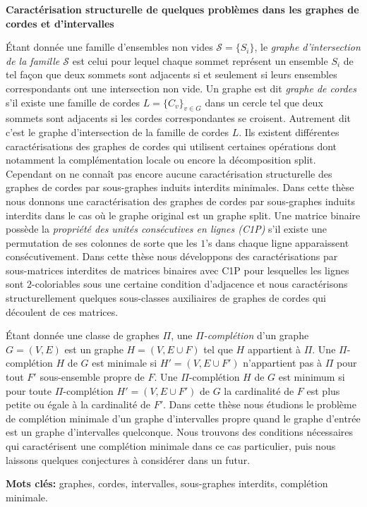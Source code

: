 \documentclass[12pt]{book}
\theoremstyle{plain}
\theoremstyle{remark}
\newenvironment{abstract}%
{\clearpage\null \vfill\begin{center}%
\bfseries \abstractname \end{center}}%
{\vfill\null}
\begin{document}

%
\begin{abstract}

\begin{center}
\textbf{Caractérisation structurelle de quelques problèmes dans les graphes de cordes et d’intervalles}
\end{center}

Étant donnée une famille d'ensembles non vides $\mathcal{S} = \{S_i\}$, le \emph{graphe d’intersection de la famille $\mathcal{S}$} est celui pour lequel chaque sommet représent un ensemble $S_i$ de tel façon que deux sommets sont adjacents si et seulement si leurs ensembles correspondants ont une intersection non vide. Un graphe est dit \emph{graphe de cordes} s'il existe une famille de cordes $L= \{ C_v \}_{v\in G}$ dans un cercle tel que deux sommets sont adjacents si les cordes correspondantes se croisent. Autrement dit c'est le graphe d'intersection de la famille de cordes $L$. Ils existent différentes caractérisations des graphes de cordes qui utilisent certaines opérations dont notamment la complémentation locale ou encore la dé\-com\-po\-si\-tion split. Cependant on ne connaît pas encore aucune caractérisation structurelle des graphes de cordes par sous-graphes induits interdits minimales. Dans cette thèse nous donnons une caractérisation des graphes de cordes par sous-graphes induits interdits dans le cas où le graphe original est un graphe split. Une matrice binaire possède la \emph{propriété des unités consécutives en lignes (C1P)} s'il existe une permutation de ses colonnes de sorte que les $1$’s dans chaque ligne apparaissent consécutivement. Dans cette thèse nous développons des caractérisations par sous-matrices interdites de matrices binaires avec C1P pour lesquelles les lignes sont $2$-coloriables sous une certaine condition d’ad\-ja\-cence et nous caractérisons structurelle\-ment quelques sous-classes auxiliaires de graphes de cordes qui découlent de ces matrices. 

Étant donnée une classe de graphes $\Pi$, une \emph{$\Pi$-complétion} d’un graphe $G = (V,E)$ est un graphe $H = (V,E \cup F)$ tel que $H$ appartient à $\Pi$. Une $\Pi$-complétion $H$ de $G$ est minimale si $H' = (V,E \cup F')$ n’appartient pas à $\Pi$ pour tout $F'$ sous-ensemble propre de $F$. Une $\Pi$-complétion $H$ de $G$ est minimum si pour toute $\Pi$-complétion $H' = (V, E \cup F')$ de $G$ la cardinalité de $F$ est plus petite ou égale à la cardinalité de $F'$. Dans cette thèse nous étudions le problème de complétion minimale d'un graphe d'intervalles propre quand le graphe d'entrée est un graphe d’intervalles quelconque. Nous trouvons des conditions nécessaires qui caractérisent une complétion minimale dans ce cas particulier, puis nous laissons quelques conjectures à considérer dans un futur. 

\vspace{2mm}
\textbf{Mots clés:} graphes, cordes, intervalles, sous-graphes interdits, complétion minimale. 
\end{abstract}
\end{document}
